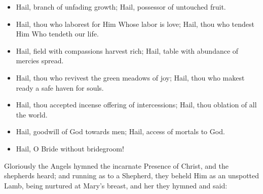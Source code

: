 \documentclass[twoside, letterpaper, 12pt]{report}
\begin{document}
\begin{itemize}[label=\tiny{+},leftmargin=*]
\item Hail, branch of unfading growth;
      Hail, possessor of untouched fruit.
\item Hail, thou who laborest for Him Whose labor is love;
      Hail, thou who tendest Him Who tendeth our life.
\item Hail, field with compassions harvest rich;
      Hail, table with abundance of mercies spread.
\item Hail, thou who revivest the green meadows of joy;
      Hail, thou who makest ready a safe haven for souls.
\item Hail, thou accepted incense offering of intercessions;
      Hail, thou oblation of all the world.
\item Hail, goodwill of God towards men;
      Hail, access of mortals to God.
\item Hail, O Bride without bridegroom! 
\end{itemize}







\begin{priest}
  \item Gloriously the Angels hymned the incarnate Presence of Christ,
  and the shepherds heard; and running as to a Shepherd,
  they beheld Him as an unspotted Lamb,
  being nurtured at Mary’s breast, and her they hymned and said:
\end{priest}
\end{document}
